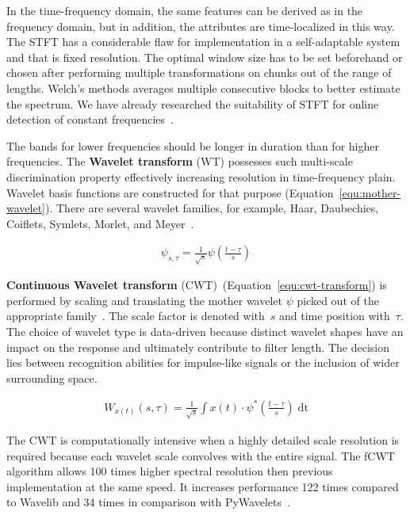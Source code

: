 In the time-frequency domain, the same features can be derived as in the frequency domain, but in addition, the attributes are time-localized in this way. The STFT has a considerable flaw for implementation in a self-adaptable system and that is fixed resolution. The optimal window size has to be set beforehand or chosen after performing multiple transformations on chunks out of the range of lengths. Welch's methods averages multiple consecutive blocks to better estimate the spectrum. We have already researched the suitability of STFT for online detection of constant frequencies~\cite{hajek_iot_2022}.

The bands for lower frequencies should be longer in duration than for higher frequencies. The \textbf{Wavelet transform} (WT) possesses such multi-scale discrimination property effectively increasing resolution in time-frequency plain. Wavelet basis functions are constructed for that purpose (Equation~\ref{equ:mother-wavelet}). There are several wavelet families, for example, Haar, Daubechies, Coiflets, Symlets, Morlet, and Meyer~\cite{nandi_condition_2019}.


\begin{ceqn}\begin{align}
\psi_{s, \tau} = \frac{1}{\sqrt{s}}\psi\left(\frac{t - \tau}{s}\right)
\label{equ:mother-wavelet}
\end{align}\end{ceqn}

\textbf{Continuous Wavelet transform} (CWT)~(Equation~\ref{equ:cwt-transform}) is performed by scaling and translating the mother wavelet $\psi$ picked out of the appropriate family~\cite{nandi_condition_2019}. The scale factor is denoted with~$s$ and time position with~$\tau$. The choice of wavelet type is data-driven because distinct wavelet shapes have an impact on the response and ultimately contribute to filter length. The decision lies between recognition abilities for impulse-like signals or the inclusion of wider surrounding space.

\begin{ceqn}\begin{align}
W_{x(t)}(s, \tau) = \frac{1}{\sqrt{s}}\int x(t) \cdot \psi^*\left(\frac{t - \tau}{s}\right)\;\mathrm{dt}
\label{equ:cwt-transform}
\end{align}\end{ceqn}

The CWT is computationally intensive when a highly detailed scale resolution is required because each wavelet scale convolves with the entire signal. The fCWT algorithm allows 100 times higher spectral resolution then previous implementation at the same speed. It increases performance 122 times compared to Wavelib and 34 times in comparison with PyWavelets~\cite{arts_fast_2022}. 

